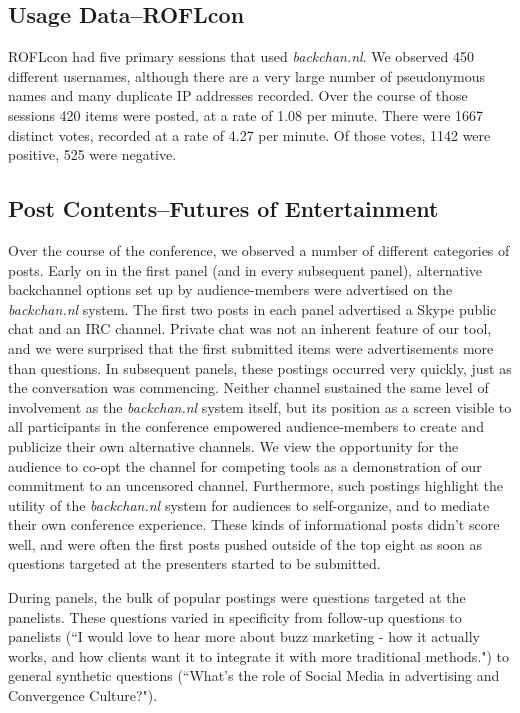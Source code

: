 \subsection{Usage Data--ROFLcon}
ROFLcon had five primary sessions that used \emph{backchan.nl}. We observed 450 different usernames, although there are a very large number of pseudonymous names and many duplicate IP addresses recorded. Over the course of those sessions 420 items were posted, at a rate of 1.08 per minute.
There were 1667 distinct votes, recorded at a rate of 4.27 per minute. Of those votes, 1142 were positive, 525 were negative. 



\subsection{Post Contents--Futures of Entertainment}

Over the course of the conference, we observed a number of different categories of posts. Early on in the first panel (and in every subsequent panel), alternative backchannel options set up by audience-members were advertised on the \emph{backchan.nl} system. The first two posts in each panel advertised a Skype public chat and an IRC channel. Private chat was not an inherent feature of our tool, and we were surprised that the first submitted items were advertisements more than questions. In subsequent panels, these postings occurred very quickly, just as the conversation was commencing. Neither channel sustained the same level of involvement as the \emph{backchan.nl} system itself, but its position as a screen visible to all participants in the conference empowered audience-members to create and publicize their own alternative channels. We view the opportunity for the audience to co-opt the channel for competing tools as a demonstration of our commitment to an uncensored channel. Furthermore, such postings highlight the utility of the \emph{backchan.nl} system for audiences to self-organize, and to mediate their own conference experience. These kinds of informational posts didn't score well, and were often the first posts pushed outside of the top eight as soon as questions targeted at the presenters started to be submitted.

During panels, the bulk of popular postings were questions targeted at the panelists. These questions varied in specificity from follow-up questions to panelists (``I would love to hear more about buzz marketing - how it actually works, and how clients want it to integrate it with more traditional methods.") to general synthetic questions (``What's the role of Social Media in advertising and Convergence Culture?").

